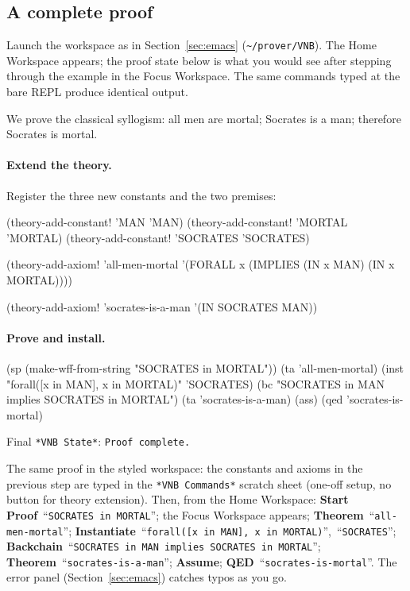 \subsection{A complete proof}
\label{sec:quickstart}

\begin{sloppypar}
Launch the workspace as in Section~\ref{sec:emacs} (\texttt{\textasciitilde/prover/VNB}).
The Home Workspace appears; the proof state below is what you would
see after stepping through the example in the Focus Workspace.  The
same commands typed at the bare REPL produce identical output.
\end{sloppypar}

We prove the classical syllogism: all men are mortal; Socrates is a
man; therefore Socrates is mortal.

\paragraph{Extend the theory.}
Register the three new constants and the two premises:

\begin{VNBsnip}
(theory-add-constant! 'MAN      'MAN)
(theory-add-constant! 'MORTAL   'MORTAL)
(theory-add-constant! 'SOCRATES 'SOCRATES)

(theory-add-axiom! 'all-men-mortal
  '(FORALL x (IMPLIES (IN x MAN) (IN x MORTAL))))

(theory-add-axiom! 'socrates-is-a-man
  '(IN SOCRATES MAN))
\end{VNBsnip}

\paragraph{Prove and install.}

\begin{VNBsnip}
(sp   (make-wff-from-string "SOCRATES in MORTAL"))
(ta   'all-men-mortal)
(inst "forall([x in MAN], x in MORTAL)" 'SOCRATES)
(bc   "SOCRATES in MAN implies SOCRATES in MORTAL")
(ta   'socrates-is-a-man)
(ass)
(qed  'socrates-is-mortal)
\end{VNBsnip}

Final \texttt{*VNB State*}: \texttt{Proof complete.}

\begin{remark}
The same proof in the styled workspace: the constants and axioms in
the previous step are typed in the \texttt{*VNB Commands*} scratch
sheet (one-off setup, no button for theory extension).  Then, from
the Home Workspace: \textbf{Start Proof}~``\texttt{SOCRATES in MORTAL}'';
the Focus Workspace appears; \textbf{Theorem}~``\texttt{all-men-mortal}'';
\textbf{Instantiate}~``\texttt{forall([x in MAN], x in MORTAL)}'',~``\texttt{SOCRATES}'';
\textbf{Backchain}~``\texttt{SOCRATES in MAN implies SOCRATES in MORTAL}'';
\textbf{Theorem}~``\texttt{socrates-is-a-man}'';
\textbf{Assume};
\textbf{QED}~``\texttt{socrates-is-mortal}''.  The error panel
(Section~\ref{sec:emacs}) catches typos as you go.
\end{remark}

